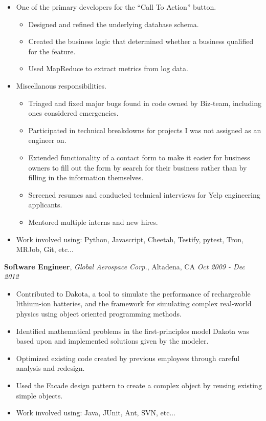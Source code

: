 \documentclass{article}
\newenvironment{changemargin}[2]{%
  \begin{list}{}{%
    \setlength{\topsep}{0pt}%
    \setlength{\leftmargin}{#1}%
    \setlength{\rightmargin}{#2}%
    \setlength{\listparindent}{\parindent}%
    \setlength{\itemindent}{\parindent}%
    \setlength{\parsep}{\parskip}%
  }%
  \item[]}{\end{list}
}
\newenvironment{body} {
  \vspace*{-16pt}
  \begin{changemargin}{-0.25in}{-0.5in}
  }
  {\end{changemargin}
}
\begin{document}
\begin{body}
\begin{itemize}
    \item One of the primary developers for the ``Call To Action'' button.
    \begin{itemize} \itemsep -0pt
      \item Designed and refined the underlying database schema.
      \item Created the business logic that determined whether a business qualified for the feature.
      \item Used MapReduce to extract metrics from log data.
    \end{itemize}

    \item Miscellanous responsibilities.
    \begin{itemize} \itemsep -0pt
      \item Triaged and fixed major bugs found in code owned by Biz-team, including ones considered emergencies.
      \item Participated in technical breakdowns for projects I was not assigned as an engineer on.
      \item Extended functionality of a contact form to make it easier for business owners to fill out the form by search for their business rather than by filling in the information themselves.
      \item Screened resumes and conducted technical interviews for Yelp engineering applicants.
      \item Mentored multiple interns and new hires.
    \end{itemize}

    \item Work involved using: Python, Javascript, Cheetah, Testify, pytest, Tron, MRJob, Git, etc...

  \end{itemize}

  \textbf {Software Engineer}, \emph{Global Aerospace Corp.}, Altadena, CA \hfill \emph{Oct 2009 - Dec 2012}\\
  \vspace*{-4pt}
  \begin{itemize} \itemsep -0pt
    \item Contributed to Dakota, a tool to simulate the performance of rechargeable lithium-ion batteries, and the framework for simulating complex real-world physics using object oriented programming methods.
    \item Identified mathematical problems in the first-principles model Dakota was based upon and implemented solutions given by the modeler.
    \item Optimized existing code created by previous employees through careful analysis and redesign.
    \item Used the Facade design pattern to create a complex object by reusing existing simple objects.
    \item Work involved using: Java, JUnit, Ant, SVN, etc...
  \end{itemize}
\end{body}
\end{document}

